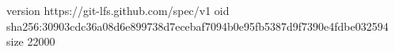 version https://git-lfs.github.com/spec/v1
oid sha256:30903cdc36a08d6e899738d7ecebaf7094b0e95fb5387d9f7390e4fdbe032594
size 22000
